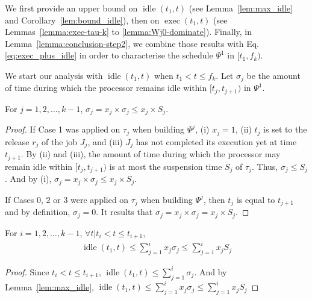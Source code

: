 We first provide an upper bound on $\operatorname{idle}(t_1, t)$ (see Lemma~\ref{lem:max_idle} and Corollary~\ref{lem:bound_idle}), then on $\operatorname{exec}(t_1, t)$ (see Lemmas~\ref{lemma:exec-tau-k} to \ref{lemma:Wj0-dominate}). Finally, in Lemma~\ref{lemma:conclusion-step2}, we combine those results with Eq. \eqref{eq:exec_plus_idle} in order to characterise the schedule $\Psi^1$ in $[t_1, f_k)$.

We start our analysis with $\operatorname{idle}(t_1, t)$ when $t_1 < t \leq f_k$.
Let $\sigma_j$ be the amount of time during which the processor remains idle within $[t_j, t_{j+1})$ in $\Psi^1$. 
\begin{Lemma}
\label{lem:max_idle}
For $j=1,2,\ldots,k-1$, $\sigma_j  = x_j \times \sigma_j \leq x_j \times S_j$. %
\end{Lemma}
\begin{proof}
If Case 1 was applied on $\tau_j$ when building $\Psi^j$, (i) $x_j = 1$, (ii) $t_j$ is set to the release $r_j$ of the job $J_j$, and (iii) $J_j$ has not completed its execution yet at time $t_{j+1}$. By (ii) and (iii), the
  amount of time during which the processor may remain idle within
  $[t_j, t_{j+1})$ is at most the suspension time $S_j$ of $\tau_j$. Thus, $\sigma_j \leq S_j$. And by (i), $\sigma_j = x_j \times \sigma_j \leq x_j \times S_j$.
  
  If Cases 0, 2 or 3 were applied on $\tau_j$ when building $\Psi^j$, then $t_j$ is equal to $t_{j+1}$ and by definition, $\sigma_j= 0$. It results that $\sigma_j= x_j \times \sigma_j = x_j \times S_j$.  
\end{proof}

\begin{Corollary}
\label{lem:bound_idle}
For $i=1,2,\ldots,k-1$, $\forall t | t_{i} < t \leq t_{i+1}$, 
\begin{align}
\label{eq:sumof-sigma}
\operatorname{idle}(t_1, t) \leq \sum_{j=1}^{i} x_j \sigma_j \leq
  \sum_{j=1}^{i} x_j S_j
\end{align}
\end{Corollary}
\begin{proof}
Since $t_{i} < t \leq t_{i+1}$, $\operatorname{idle}(t_1, t) \leq \sum_{j=1}^{i} \sigma_j$. And by Lemma~\ref{lem:max_idle}, $\operatorname{idle}(t_1, t) \leq \sum_{j=1}^{i} x_j \sigma_j \leq \sum_{j=1}^{i} x_j S_j$
\end{proof}

